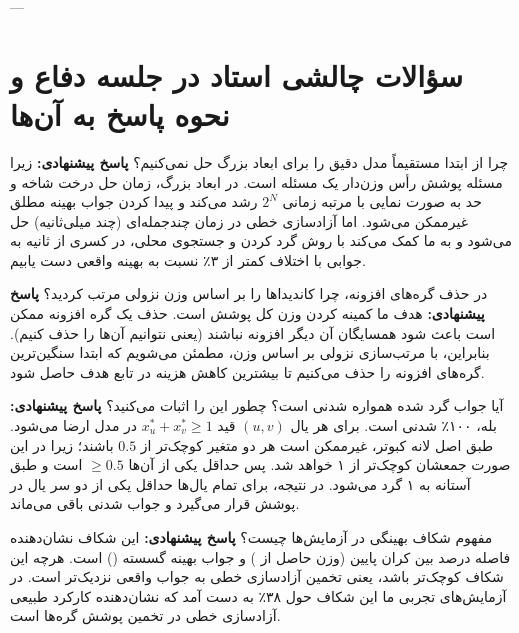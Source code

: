 \documentclass[12pt,a4paper]{article}
\begin{document}
---

\section{سؤالات چالشی استاد در جلسه دفاع و نحوه پاسخ به آن‌ها}

\begin{questionBox}{چرا از ابتدا مستقیماً مدل دقیق  را برای ابعاد بزرگ حل نمی‌کنیم؟}
\textbf{پاسخ پیشنهادی:} زیرا مسئله پوشش رأس وزن‌دار یک مسئله  است. در ابعاد بزرگ، زمان حل درخت شاخه و حد به صورت نمایی با مرتبه زمانی $2^N$ رشد می‌کند و پیدا کردن جواب بهینه مطلق غیرممکن می‌شود. اما آزادسازی خطی  در زمان چندجمله‌ای (چند میلی‌ثانیه) حل می‌شود و به ما کمک می‌کند با روش گرد کردن و جستجوی محلی، در کسری از ثانیه به جوابی با اختلاف کمتر از ۳٪ نسبت به بهینه واقعی دست یابیم.
\end{questionBox}

\begin{questionBox}{در حذف گره‌های افزونه، چرا کاندیداها را بر اساس وزن نزولی مرتب کردید؟}
\textbf{پاسخ پیشنهادی:} هدف ما کمینه کردن وزن کل پوشش است. حذف یک گره افزونه ممکن است باعث شود همسایگان آن دیگر افزونه نباشند (یعنی نتوانیم آن‌ها را حذف کنیم). بنابراین، با مرتب‌سازی نزولی بر اساس وزن، مطمئن می‌شویم که ابتدا سنگین‌ترین گره‌های افزونه را حذف می‌کنیم تا بیشترین کاهش هزینه در تابع هدف حاصل شود.
\end{questionBox}

\begin{questionBox}{آیا جواب گرد شده همواره شدنی است؟ چطور این را اثبات می‌کنید؟}
\textbf{پاسخ پیشنهادی:} بله، ۱۰۰٪ شدنی است. برای هر یال $(u, v)$ قید $x_u^* + x_v^* \ge 1$ در مدل  ارضا می‌شود. طبق اصل لانه کبوتر، غیرممکن است هر دو متغیر کوچک‌تر از $0.5$ باشند؛ زیرا در این صورت جمعشان کوچک‌تر از ۱ خواهد شد. پس حداقل یکی از آن‌ها $\ge 0.5$ است و طبق آستانه به ۱ گرد می‌شود. در نتیجه، برای تمام یال‌ها حداقل یکی از دو سر یال در پوشش قرار می‌گیرد و جواب شدنی باقی می‌ماند.
\end{questionBox}

\begin{questionBox}{مفهوم شکاف بهینگی  در آزمایش‌ها چیست؟}
\textbf{پاسخ پیشنهادی:} این شکاف نشان‌دهنده فاصله درصد بین کران پایین (وزن حاصل از ) و جواب بهینه گسسته () است. هرچه این شکاف کوچک‌تر باشد، یعنی تخمین آزادسازی خطی به جواب واقعی نزدیک‌تر است. در آزمایش‌های تجربی ما این شکاف حول ۳۸٪ به دست آمد که نشان‌دهنده کارکرد طبیعی آزادسازی خطی در تخمین پوشش گره‌ها است.
\end{questionBox}
\end{document}
